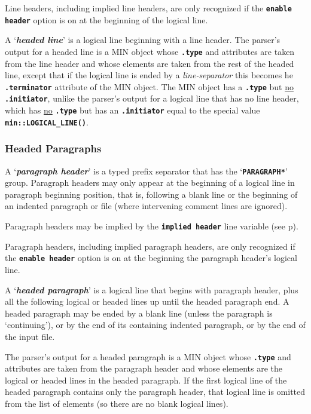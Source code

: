 \documentclass[12pt]{article}
\newcommand{\TT}[1]{{\tt \bfseries #1}}
\newcommand{\key}[1]{{\bf \em #1}\index{#1}}
\newcommand{\pagref}[1]{p\pageref{#1}}
\newcommand{\EOL}{\penalty \exhyphenpenalty}
\begin{document}
Line headers, including implied line headers,
are only recognized if the \TT{enable header}
option is on at the beginning of the logical line.

A `\key{headed line}' is a logical line beginning with a line header.
The parser's output
for a headed line is a MIN object whose \TT{.type} and attributes
are taken from the line header and whose elements are
taken from the rest of the headed line, except that if the
logical line is ended by a {\em line-separator} this becomes he
\TT{.terminator} attribute of the MIN object.  The MIN object has a \TT{.type}
but \underline{no}
\TT{.initiator}, unlike the parser's output
for a logical line that has no line header, which has \underline{no}
\TT{.type} but has an \TT{.initiator}
equal to the special value \TT{min::\EOL LOGICAL\_\EOL LINE()}.

\subsubsection{Headed Paragraphs}
\label{HEADED-PARAGRAPHS}

A `\key{paragraph header}' is a typed prefix separator that has
the `\TT{*PARAGRAPH*}' group.  Paragraph headers may only
appear at the beginning of a logical line in paragraph beginning position,
that is, following a blank
line or the beginning of an indented paragraph or file (where
intervening comment lines are ignored).

Paragraph headers may be implied 
by the \TT{implied header} line variable (see \pagref{IMPLIED-HEADER}).

Paragraph headers, including implied paragraph headers,
are only recognized if the \TT{enable header}
option is on at the beginning the paragraph header's logical line.

A `\key{headed paragraph}' is a logical line that begins with paragraph header,
plus all the following logical or headed
lines up until the headed paragraph end.
A headed paragraph may be ended by a blank line (unless the paragraph
is `continuing'), or by the end
of its containing indented paragraph, or by the end of the input file.

The parser's output for a headed paragraph is a MIN object 
whose \TT{.type} and attributes are taken from the paragraph header
and whose elements are the logical or headed lines in the headed paragraph.
If the first logical line of the headed paragraph contains only
the paragraph header, that logical line is omitted from the list of elements
(so there are no blank logical lines).
\end{document}
